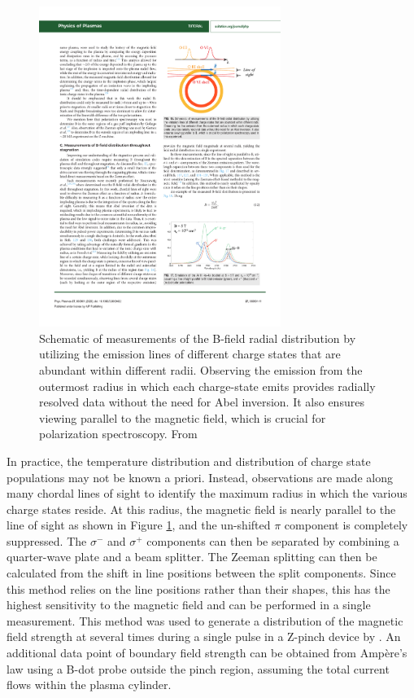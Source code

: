 \documentclass{jpp}
\begin{document}
\begin{figure}
  \centering
  \includegraphics[width=0.7\textwidth]{impurity-shells.pdf}
  \caption{Schematic of measurements of the B-field radial distribution by utilizing the emission lines of different charge states that are abundant within different radii. Observing the emission from the outermost radius in which each charge-state emits provides radially resolved data without the need for Abel inversion. It also ensures viewing parallel to the magnetic field, which is crucial for polarization spectroscopy. From \citep{doi:10.1063/5.0009432}}
\label{fig:impurity-shells}
\end{figure}

In practice, the temperature distribution and distribution of charge state populations may not be known a priori. Instead, observations are made along many chordal lines of sight to identify the maximum radius in which the various charge states reside. At this radius, the magnetic field is nearly parallel to the line of sight as shown in Figure \ref{fig:impurity-shells}, and the un-shifted $\pi$ component is completely suppressed. The $\sigma^-$ and $\sigma^+$ components can then be separated by combining a quarter-wave plate and a beam splitter. The Zeeman splitting can then be calculated from the shift in line positions between the split components. Since this method relies on the line positions rather than their shapes, this has the highest sensitivity to the magnetic field and can be performed in a single measurement. This method was used to generate a distribution of the magnetic field strength at several times during a single pulse in a Z-pinch device by \citep{Rosenzweig_2017}. An additional data point of boundary field strength can be obtained from Ampère's law using a B-dot probe outside the pinch region, assuming the total current flows within the plasma cylinder.
\end{document}
